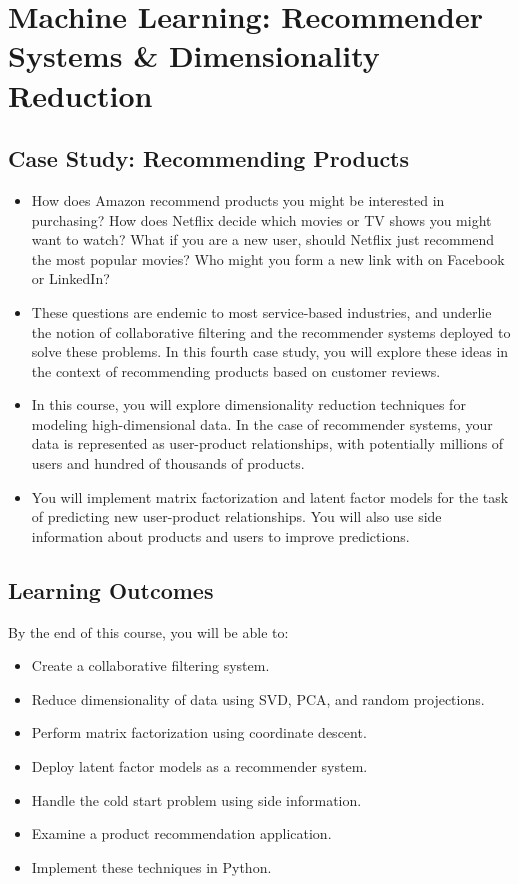 \section{Machine Learning: Recommender Systems \& Dimensionality Reduction}

\subsection{Case Study: Recommending Products}
\begin{itemize}
\item How does Amazon recommend products you might be interested in purchasing?  How does Netflix decide which movies or TV shows you might want to watch?  What if you are a new user, should Netflix just recommend the most popular movies?  Who might you form a new link with on Facebook or LinkedIn?  
\item These questions are endemic to most service-based industries, and underlie the notion of collaborative filtering and the recommender systems deployed to solve these problems.  In this fourth case study, you will explore these ideas in the context of recommending products based on customer reviews.  
\item 
In this course, you will explore dimensionality reduction techniques for modeling high-dimensional data.  In the case of recommender systems, your data is represented as user-product relationships, with potentially millions of users and hundred of thousands of products.  \item You will implement matrix factorization and latent factor models for the task of predicting new user-product relationships.  You will also use side information about products and users to improve predictions.
\end{itemize}
\subsection{Learning Outcomes}
By the end of this course, you will be able to:
\begin{itemize}
\item Create a collaborative filtering system.
\item Reduce dimensionality of data using SVD, PCA, and random projections.
\item Perform matrix factorization using coordinate descent.
\item Deploy latent factor models as a recommender system.
\item Handle the cold start problem using side information.
\item Examine a product recommendation application.
\item Implement these techniques in Python.
\end{itemize}

